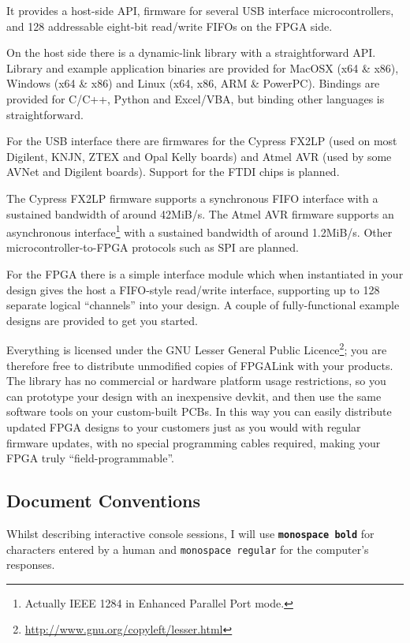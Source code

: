 It provides a host-side API, firmware for several USB interface microcontrollers, and 128 addressable eight-bit read/write FIFOs on the FPGA side.

\begin{blobs}
  \item
    On the host side there is a dynamic-link library with a straightforward API. Library and example application binaries are provided for MacOSX (x64 \& x86), Windows (x64 \& x86) and Linux (x64, x86, ARM \& PowerPC). Bindings are provided for C/C++, Python and Excel/VBA, but binding other languages is straightforward.
  \item
    For the USB interface there are firmwares for the Cypress FX2LP (used on most Digilent, KNJN, ZTEX and Opal Kelly boards) and Atmel AVR (used by some AVNet and Digilent boards). Support for the FTDI chips is planned.
  \item
    The Cypress FX2LP firmware supports a synchronous FIFO interface with a sustained bandwidth of around 42MiB/s. The Atmel AVR firmware supports an asynchronous interface\footnote{Actually IEEE 1284 in Enhanced Parallel Port mode.} with a sustained bandwidth of around 1.2MiB/s. Other microcontroller-to-FPGA protocols such as SPI are planned.
  \item
    For the FPGA there is a simple interface module which when instantiated in your design gives the host a FIFO-style read/write interface, supporting up to 128 separate logical ``channels'' into your design. A couple of fully-functional example designs are provided to get you started.
\end{blobs}

Everything is licensed under the GNU Lesser General Public Licence\footnote{\url{http://www.gnu.org/copyleft/lesser.html}}; you are therefore free to distribute unmodified copies of FPGALink with your products. The library has no commercial or hardware platform usage restrictions, so you can prototype your design with an inexpensive devkit, and then use the same software tools on your custom-built PCBs. In this way you can easily distribute updated FPGA designs to your customers just as you would with regular firmware updates, with no special programming cables required, making your FPGA truly ``field-programmable''.

\subsection{Document Conventions}
Whilst describing interactive console sessions, I will use {\bf\textcolor[rgb]{0.00,0.00,0.00}{\texttt{monospace bold}}} for characters entered by a human and {\textcolor[rgb]{0.20,0.20,0.20}{\texttt{monospace regular}}} for the computer's responses.

